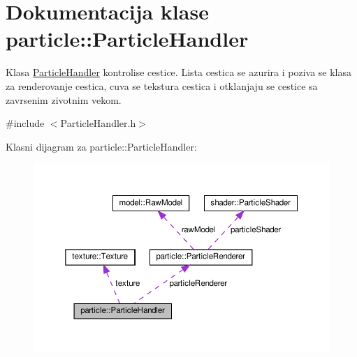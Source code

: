 \hypertarget{classparticle_1_1ParticleHandler}{}\section{Dokumentacija klase particle\+:\+:Particle\+Handler}
\label{classparticle_1_1ParticleHandler}


Klasa \hyperlink{classparticle_1_1ParticleHandler}{Particle\+Handler} kontrolise cestice. Lista cestica se azurira i poziva se klasa za renderovanje cestica, cuva se tekstura cestica i otklanjaju se cestice sa zavrsenim zivotnim vekom.  




{\ttfamily \#include $<$Particle\+Handler.\+h$>$}



Klasni dijagram za particle\+:\+:Particle\+Handler\+:
\nopagebreak
\begin{figure}[H]
\begin{center}
\leavevmode
\includegraphics[width=350pt]{classparticle_1_1ParticleHandler__coll__graph}
\end{center}
\end{figure}
